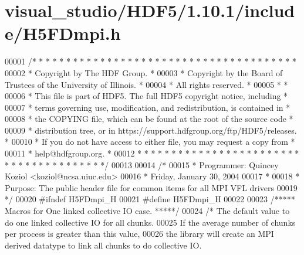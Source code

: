 \hypertarget{visual__studio_2_h_d_f5_21_810_81_2include_2_h5_f_dmpi_8h_source}{}\section{visual\+\_\+studio/\+H\+D\+F5/1.10.1/include/\+H5\+F\+Dmpi.h}
\label{visual__studio_2_h_d_f5_21_810_81_2include_2_h5_f_dmpi_8h_source}

\begin{DoxyCode}
00001 \textcolor{comment}{/* * * * * * * * * * * * * * * * * * * * * * * * * * * * * * * * * * * * * * *}
00002 \textcolor{comment}{ * Copyright by The HDF Group.                                               *}
00003 \textcolor{comment}{ * Copyright by the Board of Trustees of the University of Illinois.         *}
00004 \textcolor{comment}{ * All rights reserved.                                                      *}
00005 \textcolor{comment}{ *                                                                           *}
00006 \textcolor{comment}{ * This file is part of HDF5.  The full HDF5 copyright notice, including     *}
00007 \textcolor{comment}{ * terms governing use, modification, and redistribution, is contained in    *}
00008 \textcolor{comment}{ * the COPYING file, which can be found at the root of the source code       *}
00009 \textcolor{comment}{ * distribution tree, or in https://support.hdfgroup.org/ftp/HDF5/releases.  *}
00010 \textcolor{comment}{ * If you do not have access to either file, you may request a copy from     *}
00011 \textcolor{comment}{ * help@hdfgroup.org.                                                        *}
00012 \textcolor{comment}{ * * * * * * * * * * * * * * * * * * * * * * * * * * * * * * * * * * * * * * */}
00013 
00014 \textcolor{comment}{/*}
00015 \textcolor{comment}{ * Programmer:  Quincey Koziol <koziol@ncsa.uiuc.edu>}
00016 \textcolor{comment}{ *              Friday, January 30, 2004}
00017 \textcolor{comment}{ *}
00018 \textcolor{comment}{ * Purpose: The public header file for common items for all MPI VFL drivers}
00019 \textcolor{comment}{ */}
00020 \textcolor{preprocessor}{#ifndef H5FDmpi\_H}
00021 \textcolor{preprocessor}{#define H5FDmpi\_H}
00022 
00023 \textcolor{comment}{/***** Macros for One linked collective IO case. *****/}
00024 \textcolor{comment}{/* The default value to do one linked collective IO for all chunks.}
00025 \textcolor{comment}{   If the average number of chunks per process is greater than this value,}
00026 \textcolor{comment}{      the library will create an MPI derived datatype to link all chunks to do collective IO.}

\end{DoxyCode}
